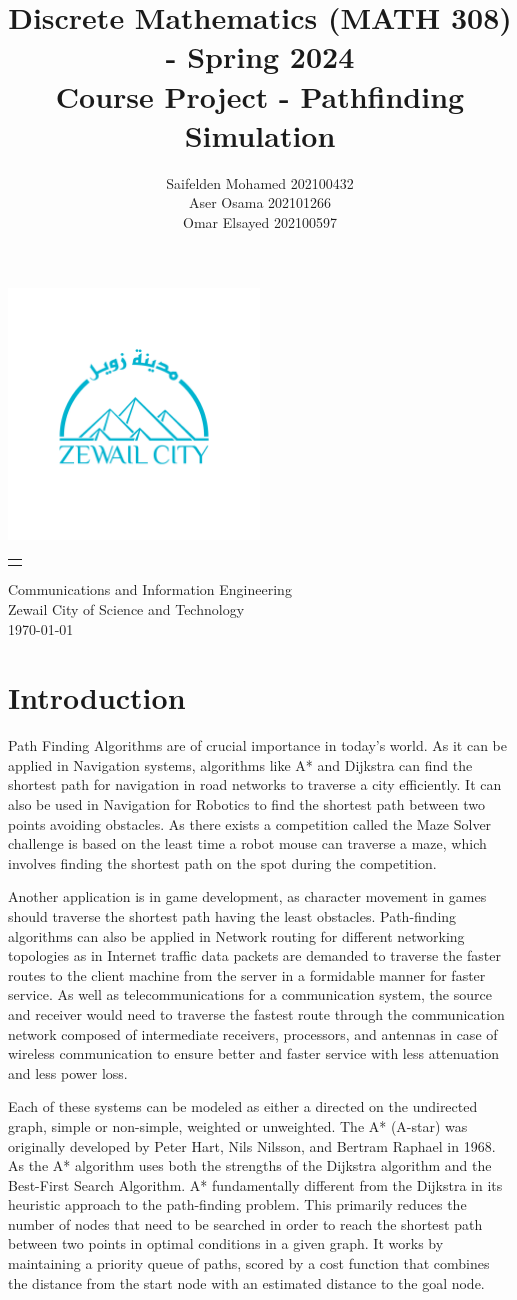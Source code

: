\documentclass[twocolumn]{article}
\title{Discrete Mathematics (MATH 308) - Spring 2024 \\ Course Project - Pathfinding Simulation }
\author{Saifelden Mohamed 202100432\\
Aser Osama 202101266\\
Omar Elsayed 202100597\\}
\date{}
\makeatletter
\renewcommand{\maketitle}{
    \thispagestyle{empty} %
    \vspace*{\fill} %
    \begin{center}
        {\huge\@title}
        
        \vspace{1cm}
        \includegraphics[width=0.5\textwidth]{zew.png}
        
        \vspace{0.5cm}

        \Large

        \begin{tabular}{c}
            \@author
        \end{tabular}

        \vspace{0.5cm}

        
        \Large
        Communications and Information Engineering\\
        Zewail City of Science and Technology\\
        \Large
        \today
    \end{center}
    \vspace*{\fill} %
}
\makeatother
\begin{document}
\onecolumn %
\maketitle
\thispagestyle{empty} %

\newpage
\tableofcontents

\newpage
\twocolumn 

\section{Introduction}
Path Finding Algorithms are of crucial importance in today’s world. As it can be applied in Navigation systems, algorithms like A* and Dijkstra can find the shortest path for navigation in road networks to traverse a city efficiently. It can also be used in Navigation for Robotics to find the shortest path between two points avoiding obstacles. As there exists a competition called the Maze Solver challenge is based on the least time a robot mouse can traverse a maze, which involves finding the shortest path on the spot during the competition. 

Another application is in game development, as character movement in games should traverse the shortest path having the least obstacles. Path-finding algorithms can also be applied in Network routing for different networking topologies as in Internet traffic data packets are demanded to traverse the faster routes to the client machine from the server in a formidable manner for faster service. As well as telecommunications for a communication system, the source and receiver would need to traverse the fastest route through the communication network composed of intermediate receivers, processors, and antennas in case of wireless communication to ensure better and faster service with less attenuation and less power loss. 

Each of these systems can be modeled as either a directed on the undirected graph, simple or non-simple, weighted or unweighted. The A* (A-star) was originally developed by Peter Hart, Nils Nilsson, and Bertram Raphael in 1968. As the A* algorithm uses both the strengths of the Dijkstra algorithm and the Best-First Search Algorithm. A* fundamentally different from the Dijkstra in its heuristic approach to the path-finding problem. This primarily reduces the number of nodes that need to be searched in order to reach the shortest path between two points in optimal conditions in a given graph. It works by maintaining a priority queue of paths, scored by a cost function that combines the distance from the start node with an estimated distance to the goal node. 
\end{document}
